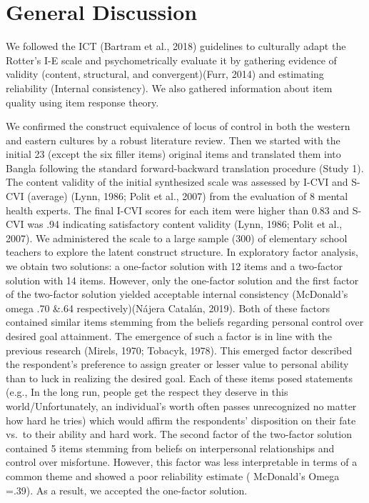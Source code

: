 \documentclass[
  man]{apa6}
\begin{document}
\hypertarget{general-discussion}{%
\section{General Discussion}\label{general-discussion}}

We followed the ICT (Bartram et al., 2018) guidelines to culturally adapt the Rotter's I-E scale and psychometrically evaluate it by gathering evidence of validity (content, structural, and convergent)(Furr, 2014) and estimating reliability (Internal consistency). We also gathered information about item quality using item response theory.

We confirmed the construct equivalence of locus of control in both the western and eastern cultures by a robust literature review. Then we started with the initial 23 (except the six filler items) original items and translated them into Bangla following the standard forward-backward translation procedure (Study 1). The content validity of the initial synthesized scale was assessed by I-CVI and S-CVI (average) (Lynn, 1986; Polit et al., 2007) from the evaluation of 8 mental health experts. The final I-CVI scores for each item were higher than 0.83 and S-CVI was .94 indicating satisfactory content validity (Lynn, 1986; Polit et al., 2007). We administered the scale to a large sample (300) of elementary school teachers to explore the latent construct structure. In exploratory factor analysis, we obtain two solutions: a one-factor solution with 12 items and a two-factor solution with 14 items. However, only the one-factor solution and the first factor of the two-factor solution yielded acceptable internal consistency (McDonald's omega .70 \&.64 respectively)(Nájera Catalán, 2019). Both of these factors contained similar items stemming from the beliefs regarding personal control over desired goal attainment. The emergence of such a factor is in line with the previous research (Mirels, 1970; Tobacyk, 1978). This emerged factor described the respondent's preference to assign greater or lesser value to personal ability than to luck in realizing the desired goal. Each of these items posed statements (e.g., In the long run, people get the respect they deserve in this world/Unfortunately, an individual's worth often passes unrecognized no matter how hard he tries) which would affirm the respondents' disposition on their fate vs.~to their ability and hard work. The second factor of the two-factor solution contained 5 items stemming from beliefs on interpersonal relationships and control over misfortune. However, this factor was less interpretable in terms of a common theme and showed a poor reliability estimate ( McDonald's Omega =.39). As a result, we accepted the one-factor solution.
\end{document}
